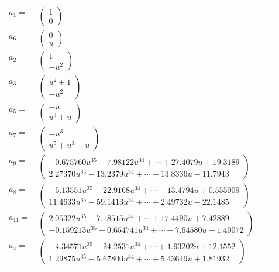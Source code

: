 \documentclass[1p]{elsarticle_modified}
\theoremstyle{definition}
\begin{document}
\begin{tabular}{m{7pt} m{180pt} m{7pt} m{180pt} }
\flushright $a_{1}=$&$\begin{pmatrix}1\\0\end{pmatrix}$ \\
\flushright $a_{6}=$&$\begin{pmatrix}0\\u\end{pmatrix}$ \\
\flushright $a_{2}=$&$\begin{pmatrix}1\\- u^2\end{pmatrix}$ \\
\flushright $a_{3}=$&$\begin{pmatrix}u^2+1\\- u^2\end{pmatrix}$ \\
\flushright $a_{5}=$&$\begin{pmatrix}- u\\u^3+u\end{pmatrix}$ \\
\flushright $a_{7}=$&$\begin{pmatrix}- u^3\\u^5+u^3+u\end{pmatrix}$ \\
\flushright $a_{9}=$&$\begin{pmatrix}-0.675760 u^{35}+7.98122 u^{34}+\cdots+27.4079 u+19.3189\\2.27370 u^{35}-13.2379 u^{34}+\cdots-13.8336 u-11.7943\end{pmatrix}$ \\
\flushright $a_{8}=$&$\begin{pmatrix}-5.13551 u^{35}+22.9168 u^{34}+\cdots-13.4794 u+0.555009\\11.4633 u^{35}-59.1413 u^{34}+\cdots+2.49732 u-22.1485\end{pmatrix}$ \\
\flushright $a_{11}=$&$\begin{pmatrix}2.05322 u^{35}-7.18515 u^{34}+\cdots+17.4490 u+7.42889\\-0.159213 u^{35}+0.654741 u^{34}+\cdots-7.64580 u-1.40072\end{pmatrix}$ \\
\flushright $a_{4}=$&$\begin{pmatrix}-4.34571 u^{35}+24.2531 u^{34}+\cdots+1.93202 u+12.1552\\1.29875 u^{35}-5.67800 u^{34}+\cdots+5.43649 u+1.81932\end{pmatrix}$ \\

\end{tabular}
\end{document}
